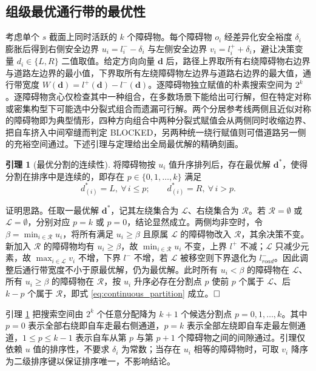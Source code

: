 \documentclass[a4paper,11pt]{ctexart}
\theoremstyle{definition}
\newtheorem{lemma}{引理}[section]
\begin{document}
\subsection{组级最优通行带的最优性}
\label{sec:thy_max_gap}

考虑单个 $s$ 截面上同时活跃的 $k$ 个障碍物。每个障碍物 $o_i$ 经差异化安全裕度 $\delta_i$ 膨胀后得到右侧安全边界 $u_i = l_i^{-} - \delta_i$ 与左侧安全边界 $v_i = l_i^{+} + \delta_i$，避让决策变量 $d_i \in \{L, R\}$ 二值取值。给定方向向量 $\mathbf{d}$ 后，路径上界取所有右绕障碍物右边界与道路左边界的最小值，下界取所有左绕障碍物左边界与道路右边界的最大值，通行带宽度 $W(\mathbf{d}) = l^{+}(\mathbf{d}) - l^{-}(\mathbf{d})$。逐障碍物独立赋值的朴素搜索空间为 $2^k$。逐障碍物贪心仅检查其中一种组合，在多数场景下能给出可行解，但在特定对称或密集构型下可能选中分裂式组合而遗漏可行解。两个分居参考线两侧且近似对称的障碍物即为典型情形，四种方向组合中两种分裂式赋值会从两侧同时收缩边界、把自车挤入中间窄缝而判定 BLOCKED，另两种统一绕行赋值则可借道路另一侧的充裕空间通过。下述引理与定理给出全局最优解的精确刻画。

\begin{lemma}[最优分割的连续性]
\label{lem:continuous_partition}
将障碍物按 $u_i$ 值升序排列后，存在最优解 $\mathbf{d}^{*}$，使得分割在排序中是连续的，即存在 $p \in \{0, 1, \ldots, k\}$ 满足
\begin{equation}
    d_{(i)}^{*} = L,\ \forall\, i \leq p; \qquad d_{(i)}^{*} = R,\ \forall\, i > p.
    \label{eq:continuous_partition}
\end{equation}
\end{lemma}

证明思路。任取一最优解 $\mathbf{d}^{*}$，记其左绕集合为 $\mathcal{L}$、右绕集合为 $\mathcal{R}$。若 $\mathcal{R}=\emptyset$ 或 $\mathcal{L}=\emptyset$，分别对应 $p=k$ 或 $p=0$，结论显然成立。两侧均非空时，令 $\beta = \min_{i \in \mathcal{R}} u_i$，将所有满足 $u_i \geq \beta$ 且原属 $\mathcal{L}$ 的障碍物改入 $\mathcal{R}$，其余决策不变。新加入 $\mathcal{R}$ 的障碍物均有 $u_i \geq \beta$，故 $\min_{i \in \mathcal{R}} u_i$ 不变，上界 $l^{+}$ 不减；$\mathcal{L}$ 只减少元素，故 $\max_{i \in \mathcal{L}} v_i$ 不增，下界 $l^{-}$ 不增，若 $\mathcal{L}$ 被移空则下界退化为 $l_{road}^{-}$。因此调整后通行带宽度不小于原最优解，仍为最优解。此时所有 $u_i < \beta$ 的障碍物在 $\mathcal{L}$、所有 $u_i \geq \beta$ 的障碍物在 $\mathcal{R}$，按 $u_i$ 升序必存在分割点 $p$ 使前 $p$ 个属于 $\mathcal{L}$、后 $k-p$ 个属于 $\mathcal{R}$，即式 \eqref{eq:continuous_partition} 成立。$\hfill\Box$

引理 \ref{lem:continuous_partition} 把搜索空间由 $2^k$ 个任意分配降为 $k+1$ 个候选分割点 $p = 0, 1, \ldots, k$。其中 $p=0$ 表示全部右绕即自车走最右侧通道，$p=k$ 表示全部左绕即自车走最左侧通道，$1 \leq p \leq k-1$ 表示自车从第 $p$ 与第 $p+1$ 个障碍物之间的间隙通过。引理仅依赖 $u$ 值的排序性，不要求 $\delta_i$ 为常数；当存在 $u_i$ 相等的障碍物时，可取 $v_i$ 降序为二级排序键以保证排序唯一，不影响结论。
\end{document}

